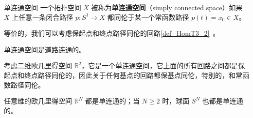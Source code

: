 

\begin{definition}{单连通空间}\label{def_SmpCn_1}
一个拓扑空间 $X$ 被称为\textbf{单连通空间}（simply connected space）如果 $X$ 上任意一条闭合路径 $p: S^1 \to X$ 都同伦于某一个常函数路径 $p(t) = x_0 \in X$。
\end{definition}

等价的，我们可以考虑保起点和终点路径同伦的回路\autoref{def_HomT3_2}~。

\begin{theorem}{}
单连通空间是道路连通的。
\end{theorem}

\begin{example}{}
考虑二维欧几里得空间 $\mathbb{R}^2$，它是一个单连通空间，它上面的所有回路之间都是保起点和终点路径同伦的，因此关于任何基点的回路都保基点同伦，特别的，和常函数路径同伦。

任意维的欧几里得空间 $\mathbb{R}^N$ 都是单连通的；当 $N \geq 2$ 时，球面 $S^N$ 也都是单连通的。
\end{example}